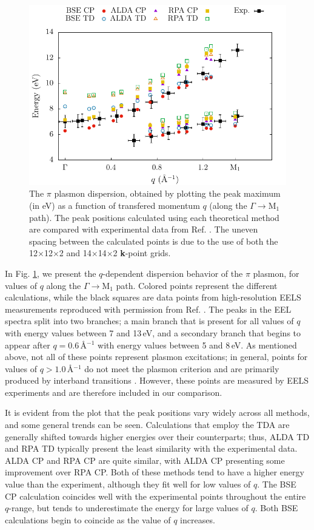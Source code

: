 \documentclass[aps,prb,10pt,showpacs,superscriptaddress,twocolumn,notitlepage]{revtex4-1}
\begin{document}
\begin{figure}[t]
\includegraphics[width=\linewidth]{fig04}
\caption{
The $\pi$ plasmon dispersion, obtained by plotting the peak maximum (in eV) as
a function of transfered momentum $q$ (along the $\Gamma \rightarrow
\mathrm{M}_{1}$ path). The peak positions calculated using each theoretical
method are compared with experimental data from Ref. . The
uneven spacing between the calculated points is due to the use of both the
12$\times$12$\times$2 and 14$\times$14$\times$2 \textbf{k}-point grids.
}
\label{fig:gm-dispersion}
\end{figure}

In Fig. \ref{fig:gm-dispersion}, we present the $q$-dependent dispersion
behavior of the $\pi$ plasmon, for values of $q$ along the $\Gamma \rightarrow
\mathrm{M}_{1}$ path. Colored points represent the different calculations, while
the black squares are data points from high-resolution EELS measurements
reproduced with permission from Ref. . The peaks in the
EEL spectra split into two branches; a main branch that is present for all
values of $q$ with energy values between 7 and 13\,eV, and a secondary branch
that begins to appear after $q = 0.6$\,\r{A}$^{-1}$ with energy values between 5
and 8\,eV. As mentioned above, not all of these points represent plasmon
excitations; in general, points for values of $q > 1.0$\,\r{A}$^{-1}$ do not meet
the plasmon criterion and are primarily produced by interband transitions
\cite{marinopoulosPRB04}. However, these points are measured by EELS experiments
and are therefore included in our comparison.

It is evident from the plot that the peak positions vary widely across all
methods, and some general trends can be seen. Calculations that employ the TDA
are generally shifted towards higher energies over their counterparts; thus,
ALDA TD and RPA TD typically present the least similarity with the experimental
data. ALDA CP and RPA CP are quite similar, with ALDA CP presenting some
improvement over RPA CP. Both of these methods tend to have a higher energy
value than the experiment, although they fit well for low values of $q$. The BSE
CP calculation coincides well with the experimental points throughout the entire
$q$-range, but tends to underestimate the energy for large values of $q$. Both
BSE calculations begin to coincide as the value of $q$ increases.
\end{document}
